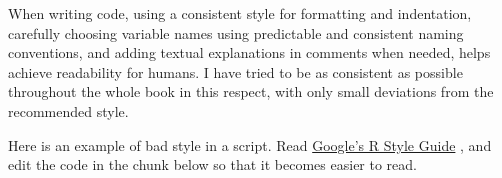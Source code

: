 \begin{playground}
\begin{infobox}
When writing code, using a consistent style for formatting and indentation, carefully choosing variable names using predictable and consistent naming conventions, and adding textual explanations in comments when needed, helps achieve readability for humans. I have tried to be as consistent as possible throughout the whole book in this respect, with only small deviations from the recommended style.
\end{infobox}

\begin{playground}
Here is an example of bad style in a script. Read \href{https://google.github.io/styleguide/Rguide.xml}{Google's R Style Guide}%
, and edit the code in the chunk below so that it becomes easier to read.



















































































\end{playground}
\end{playground}
